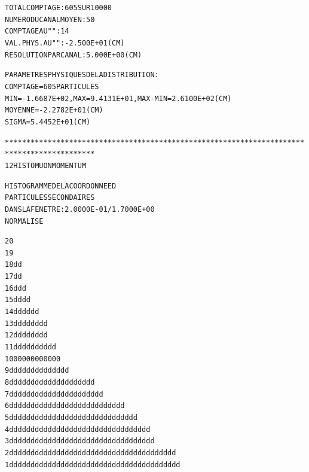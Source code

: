 \begin{alltt}
                TOTAL  COMPTAGE                 :     605  SUR  10000
                NUMERO   DU  CANAL  MOYEN       :      50
                COMPTAGE  AU   "      "         :      14
                VAL. PHYS. AU  "      "         : -2.500E+01 (CM) 
                RESOLUTION  PAR  CANAL          :  5.000E+00 (CM) 

                PARAMETRES  PHYSIQUES  DE  LA  DISTRIBUTION :
                              COMPTAGE =    605  PARTICULES
                              MIN= -1.6687E+02, MAX = 9.4131E+01, MAX-MIN = 2.6100E+02 (CM) 
                              MOYENNE = -2.2782E+01 (CM) 
                              SIGMA =  5.4452E+01 (CM) 

*******************************************************************************************
     12  HISTO     MUON      MOMENTUM

                              HISTOGRAMME  DE  LA  COORDONNEE    D  
                              PARTICULES  SECONDAIRES               
                              DANS  LA  FENETRE :   2.0000E-01 /   1.7000E+00      
                              NORMALISE     

   20                                                                                      
   19                                                                                      
   18                                           d   d                                      
   17                                           d   d                                      
   16                                           d   dd                                     
   15                                          dd   dd                                     
   14                                         ddd d dd                                     
   13                                         ddd d dd     dd                              
   12                                         ddd d dd     dd                              
   11                                         ddd d ddd d  dd                              
   10                                        0000 0 000 0  00                              
    9                                       ddddd ddddd dd dd                              
    8                                      ddddddddddddddd ddddd                           
    7                                      dddddddddddddddddddddd                          
    6                                     dddddddddddddddddddddddd ddd                     
    5                                    dddddddddddddddddddddddddddddd                    
    4                                  ddddddddddddddddddddddddddddddddd                   
    3                                  ddddddddddddddddddddddddddddddddd  d                
    2                                 ddddddddddddddddddddddddddddddddddd dddd             
    1                                 dddddddddddddddddddddddddddddddddddddddd             


\end{alltt}
